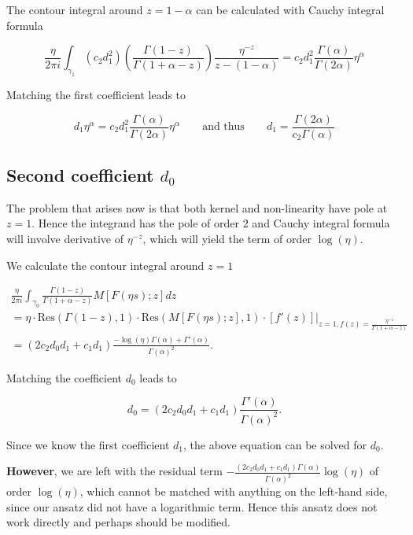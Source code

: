 \documentclass[12pt]{article}
\theoremstyle{plain}
\begin{document}
The contour integral around $z = 1-\alpha$ can be calculated with Cauchy integral formula 

$$
\frac{\eta}{2 \pi i} \int_{\gamma_1} \left(c_{2} d_{1}^{2}\right) \left( \frac{\Gamma(1-z)}{\Gamma(1+\alpha-z)}\right) \frac{\eta^{-z}}{z-(1-\alpha)} = c_2 d_1^2 \frac{\Gamma(\alpha)}{\Gamma(2\alpha)} \eta ^\alpha
$$

Matching the first coefficient leads to 

$$
d_1 \eta ^\alpha = c_2 d_1^2 \frac{\Gamma(\alpha)}{\Gamma(2\alpha)} \eta ^\alpha
\qquad \text{and thus} \qquad
d_1 = \frac{\Gamma(2\alpha)}{c_2 \Gamma(\alpha)}
$$

\subsection{Second coefficient $d_0$}

The problem that arises now is that both kernel and non-linearity have pole at $z=1$. Hence the integrand has the pole of order 2 and Cauchy integral formula will involve derivative of $\eta ^{-z}$, which will yield the term of order $\log (\eta)$.

We calculate the contour integral around $z=1$

\begin{equation} \label{cauchy integral formula for second coefficient}
\begin{array}{l}
\frac{\eta}{2 \pi i} \int_{\gamma_0} \frac{\Gamma(1-z)}{\Gamma(1+\alpha-z)} M[F(\eta s) ; z] d z \\ [10pt]
= \eta \cdot \text{Res}(\Gamma(1-z), 1) \cdot \text{Res}(M[F(\eta s); z], 1) \cdot \left. [f'(z)] \right| _{z = 1, f(z) = \frac{\eta^{-z}}{\Gamma(1+\alpha-z)}} \\ [10pt]
= (2c_2 d_{0} d_{1}+c_1 d_{1}) \frac{-\log (\eta) \Gamma(\alpha) + \Gamma'(\alpha)}{\Gamma(\alpha)^2}.
\end{array}
\end{equation}

Matching the coefficient $d_0$ leads to

$$
d_0 = (2c_2 d_{0} d_{1}+c_1 d_{1}) \frac{\Gamma'(\alpha)}{\Gamma(\alpha)^2}.
$$

Since we know the first coefficient $d_1$, the above equation can be solved for $d_0$.

\textbf{However}, we are left with the residual term $- \frac{(2c_2 d_{0} d_{1}+c_1 d_{1}) \Gamma(\alpha)}{\Gamma(\alpha)^2} \log (\eta)$ of order $ \log (\eta)$, which cannot be matched with anything on the left-hand side, since our ansatz did not have a logarithmic term. Hence this ansatz does not work directly and perhaps should be modified.
\end{document}
